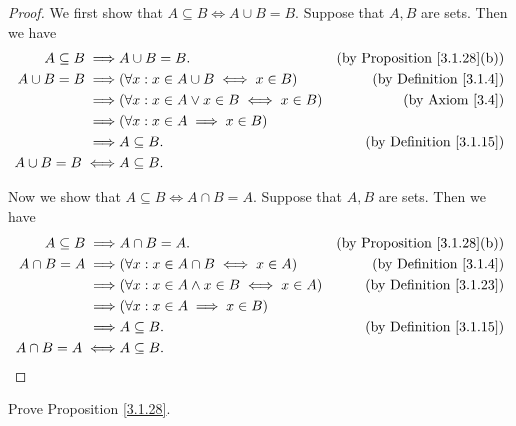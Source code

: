 \begin{proof}
    We first show that \(A \subseteq B \iff A \cup B = B\).
    Suppose that \(A, B\) are sets.
    Then we have
    \begin{align*}
        A \subseteq B \implies & A \cup B = B.                                   & \text{(by Proposition \ref{3.1.28}(b))} \\
        A \cup B = B \implies  & (\forall x : x \in A \cup B \iff x \in B)       & \text{(by Definition \ref{3.1.4})}      \\
        \implies               & (\forall x : x \in A \lor x \in B \iff x \in B) & \text{(by Axiom \ref{3.4})}             \\
        \implies               & (\forall x : x \in A \implies x \in B)                                                    \\
        \implies               & A \subseteq B.                                  & \text{(by Definition \ref{3.1.15})}     \\
        A \cup B = B \iff      & A \subseteq B.
    \end{align*}

    Now we show that \(A \subseteq B \iff A \cap B = A\).
    Suppose that \(A, B\) are sets.
    Then we have
    \begin{align*}
        A \subseteq B \implies & A \cap B = A.                                    & \text{(by Proposition \ref{3.1.28}(b))} \\
        A \cap B = A \implies  & (\forall x : x \in A \cap B \iff x \in A)        & \text{(by Definition \ref{3.1.4})}      \\
        \implies               & (\forall x : x \in A \land x \in B \iff x \in A) & \text{(by Definition \ref{3.1.23})}     \\
        \implies               & (\forall x : x \in A \implies x \in B)                                                     \\
        \implies               & A \subseteq B.                                   & \text{(by Definition \ref{3.1.15})}     \\
        A \cap B = A \iff      & A \subseteq B.
    \end{align*}
\end{proof}

\begin{exercise}\label{ex 3.1.6}
    Prove Proposition \ref{3.1.28}.
\end{exercise}

